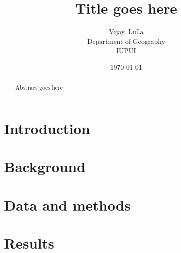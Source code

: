 \documentclass[letterpaper,11pt]{article}
\title{Title goes here}
\author{Vijay~Lulla\\
  Department of Geography\\
  IUPUI}
\date{\today}
\begin{document}
\maketitle

\begin{abstract}
Abstract goes here
\end{abstract}

\section{Introduction}
\label{sec:introduction}

\section{Background}
\label{sec:background}

\section{Data and methods}
\label{sec:data-and-methods}

\section{Results}
\label{sec:results}

\end{document}
